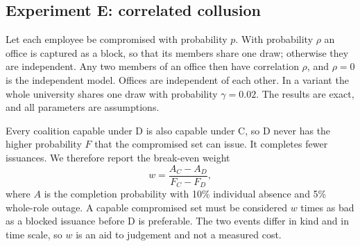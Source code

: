 \subsection{Experiment E: correlated collusion}\label{sec:correlation}
Let each employee be compromised with probability $p$. With probability $\rho$ an office is captured as a block, so that its members share one draw; otherwise they are independent. Any two members of an office then have correlation $\rho$, and $\rho=0$ is the independent model. Offices are independent of each other. In a variant the whole university shares one draw with probability $\gamma=0.02$. The results are exact, and all parameters are assumptions.

Every coalition capable under D is also capable under C, so D never has the higher probability $F$ that the compromised set can issue. It completes fewer issuances. We therefore report the break-even weight
\begin{equation}
w=\frac{A_C-A_D}{F_C-F_D},
\end{equation}
where $A$ is the completion probability with 10\% individual absence and 5\% whole-role outage. A capable compromised set must be considered $w$ times as bad as a blocked issuance before D is preferable. The two events differ in kind and in time scale, so $w$ is an aid to judgement and not a measured cost.
